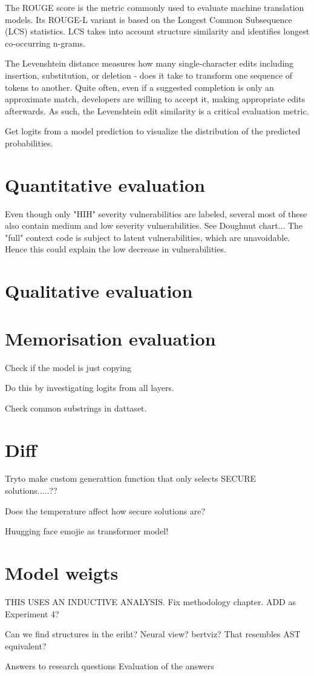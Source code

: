 The ROUGE score is the metric commonly used to evaluate machine translation models. Its ROUGE-L variant is based on the Longest Common Subsequence (LCS) statistics. LCS takes into account structure similarity and identifies longest co-occurring n-grams.

The Levenshtein distance measures how many single-character edits  including insertion, substitution, or deletion - does it take to transform one sequence of tokens to another. Quite often, even if a suggested completion is only an approximate match, developers are willing to accept it, making appropriate edits afterwards. As such, the Levenshtein edit similarity is a critical evaluation metric.


Get logits from a model  prediction to visualize the distribution of the predicted probabilities.

\section{Quantitative evaluation}

Even though only "HIH" severity vulnerabilities are labeled, several most of these also contain medium and low severity vulnerabilities. See Doughnut chart...  
The "full" context code is subject to latent vulnerabilities, which are unavoidable. Hence this could explain the low decrease in vulnerabilities.




\section{Qualitative evaluation}


\section{Memorisation evaluation}
Check if the model is just copying

Do this by investigating logits from  all layers.

Check common substrings in dattaset.

\section{Diff}

Tryto make custom generattion function that only selects SECURE solutions.....??

Does the temperature affect how secure solutions are?


Huugging face emojie as transformer model!


\section{Model weigts}
THIS USES AN INDUCTIVE ANALYSIS. Fix methodology chapter. ADD as Experiment 4?

Can  we  find structures in the eriht? Neural  view? bertviz? That resembles AST equivalent?

Answers to research questions
Evaluation of the answers